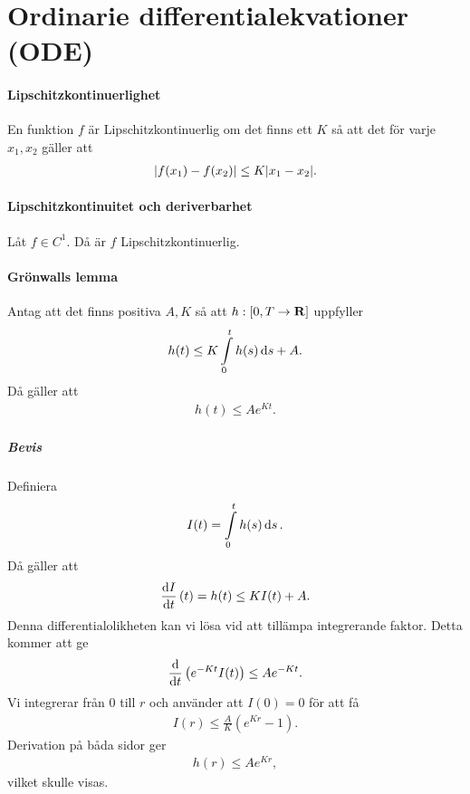 \section{Ordinarie differentialekvationer (ODE)}

\paragraph{Lipschitzkontinuerlighet}
En funktion $f$ är Lipschitzkontinuerlig om det finns ett $K$ så att det för varje $x_1, x_2$ gäller att
\begin{align*}
	\abs{f(x_1) - f(x_2)} \leq K\abs{x_1 - x_2}.
\end{align*}

\paragraph{Lipschitzkontinuitet och deriverbarhet}
Låt $f\in C^{1}$. Då är $f$ Lipschitzkontinuerlig.

\paragraph{Grönwalls lemma}
Antag att det finns positiva $A, K$ så att $h: [0, T\to\mathbf{R}]$ uppfyller
\begin{align*}
	h(t) \leq K\int\limits_{0}^{t}h(s)\dd{s} + A.
\end{align*}
Då gäller att
\begin{align*}
	h(t) \leq Ae^{Kt}.
\end{align*}

\subparagraph{Bevis}
Definiera
\begin{align*}
	I(t) = \int\limits_{0}^{t}h(s)\dd{s}.
\end{align*}
Då gäller att
\begin{align*}
	\dv{I}{t} \left(t\right) = h(t) \leq KI(t) + A.
\end{align*}
Denna differentialolikheten kan vi lösa vid att tillämpa integrerande faktor. Detta kommer att ge
\begin{align*}
	\dv{t}\left(e^{-Kt}I(t)\right) \leq Ae^{-Kt}.
\end{align*}
Vi integrerar från $0$ till $r$ och använder att $I(0) = 0$ för att få
\begin{align*}
	I(r) \leq \frac{A}{K}(e^{Kr} - 1).
\end{align*}
Derivation på båda sidor ger
\begin{align*}
	h(r) \leq Ae^{Kr},
\end{align*}
vilket skulle visas.

